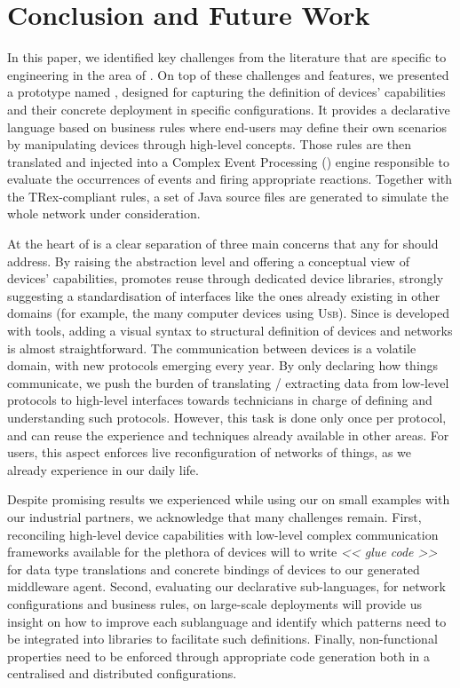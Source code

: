 \section{Conclusion and Future Work}
\label{sec:Conclusion}

In this paper, we identified key challenges from the literature that are specific to \DSL engineering in the area of \IOT. On top of these challenges and features, we presented a prototype \DSL named \IOTDSL, designed for capturing the definition of devices' capabilities and their concrete deployment in specific configurations. It provides a declarative language based on business rules where end-users may define their own scenarios by manipulating devices through high-level concepts. Those rules are then translated and injected into a Complex Event Processing (\CEP) engine responsible to evaluate the occurrences of events and firing appropriate reactions. Together with the TRex-compliant rules, a set of Java source files are generated to simulate the whole network under consideration.  

At the heart of \IOTDSL is a clear separation of three main concerns that any \DSL for \IOT should address. By raising the abstraction level and offering a conceptual view of devices' capabilities, \IOTDSL promotes reuse through dedicated device libraries, strongly suggesting a standardisation of interfaces like the ones already existing in other domains (for example, the many computer devices using \textsc{Usb}). Since \IOTDSL is developed with \MDE tools, adding a visual syntax to structural definition of devices and networks is almost straightforward. The communication between devices is a volatile domain, with new protocols emerging every year. By only declaring how things communicate, we push the burden of translating / extracting data from low-level protocols to high-level interfaces towards technicians in charge of defining and understanding such protocols. However, this task is done only once per protocol, and can reuse the experience and techniques already available in other areas. For users, this aspect enforces live reconfiguration of networks of things, as we already experience in our daily life. 

Despite promising results we experienced while using our \DSL on small examples with our industrial partners, we acknowledge that many challenges remain. First, reconciling high-level device capabilities with low-level complex communication frameworks available for the plethora of devices will to write \textit{<< glue code >>} for data type translations and concrete bindings of devices to our generated middleware agent. Second, evaluating our declarative sub-languages, for network configurations and business rules, on large-scale deployments will provide us insight on how to improve each sublanguage and identify which patterns need to be integrated into libraries to facilitate such definitions. Finally, non-functional properties need to be enforced through appropriate code generation both in a centralised and distributed configurations.
